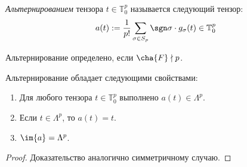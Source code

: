 \begin{definition}
    \textit{Альтернированием} тензора $t \in \mathbb{T}^p_0$ называется следующий тензор:
    \[a(t) := \frac1{p!}\sum_{\sigma \in S_p}\sgn\sigma\cdot g_\sigma(t) \in \mathbb{T}^p_0\]
    
    Альтернирование определено, если $\cha{F} \nmid p$.
\end{definition}

\begin{proposition} 
    Альтернирование обладает следующими свойствами:
    \begin{enumerate}
        \item Для любого тензора $t \in \mathbb{T}^p_0$ выполнено $a(t) \in \Lambda^p$.
        \item Если $t \in \Lambda^p$, то $a(t) = t$.
        \item $\im{a} = \Lambda^p$.
    \end{enumerate}
\end{proposition}

\begin{proof}
    Доказательство аналогично симметричному случаю.
\end{proof}